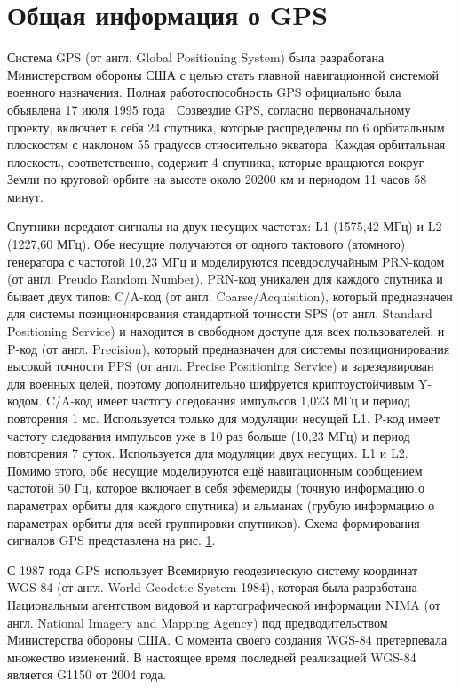 \section{Общая информация о GPS}

Система GPS (от англ. Global Positioning System) была разработана Министерством обороны США с целью стать главной навигационной системой военного назначения. 
Полная работоспособность GPS официально была объявлена 17 июля 1995 года \cite{3}.
Созвездие GPS, согласно первоначальному проекту, включает в себя 24 спутника, которые распределены по 6 орбитальным плоскостям с наклоном 55 градусов относительно экватора. 
Каждая орбитальная плоскость, соответственно, содержит 4 спутника, которые вращаются вокруг Земли по круговой орбите на высоте около 20200 км и периодом 11 часов 58 минут.

Спутники передают сигналы на двух несущих частотах: L1 (1575,42 МГц) и L2 (1227,60 МГц).
Обе несущие получаются от одного тактового (атомного) генератора с частотой 10,23 МГц и моделируются псевдослучайным PRN-кодом (от англ. Preudo Random Number).
PRN-код уникален для каждого спутника и бывает двух типов: C/A-код (от англ. Coarse/Acquisition), который предназначен для системы позиционирования стандартной точности SPS (от англ. Standard Positioning Service) и находится в свободном доступе для всех пользователей, и P-код (от англ. Precision), который предназначен для системы позиционирования высокой точности PPS (от англ. Precise Positioning
Service) и зарезервирован для военных целей, поэтому дополнительно шифруется криптоустойчивым Y-кодом. 
C/A-код имеет частоту следования импульсов 1,023 МГц и период повторения 1 мс. 
Используется только для модуляции несущей L1.
P-код имеет частоту следования импульсов уже в 10 раз больше (10,23 МГц) и период повторения 7 суток.
Используется для модуляции двух несущих: L1 и L2.
Помимо этого, обе несущие моделируются ещё навигационным сообщением частотой 50 Гц, которое включает в себя эфемериды (точную информацию о параметрах орбиты для каждого спутника) и альманах (грубую информацию о параметрах орбиты для всей группировки спутников).
Схема формирования сигналов GPS представлена на рис. \hyperref[fig-1]{1}.

С 1987 года GPS использует Всемирную геодезическую систему координат WGS-84 (от англ. World Geodetic System 1984), которая была разработана Национальным агентством видовой и картографической информации NIMA (от англ. National Imagery and Mapping Agency) под предводительством Министерства обороны США.
С момента своего создания WGS-84 претерпевала множество изменений.
В настоящее время последней реализацией WGS-84 является G1150 от 2004 года.

